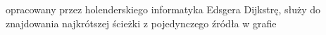 \documentclass[preview]{standalone}
\begin{document}
\begin{center}
opracowany przez holenderskiego informatyka Edsgera Dijkstrę, służy do znajdowania najkrótszej ścieżki z pojedynczego źródła w grafie
\end{center}
\end{document}

